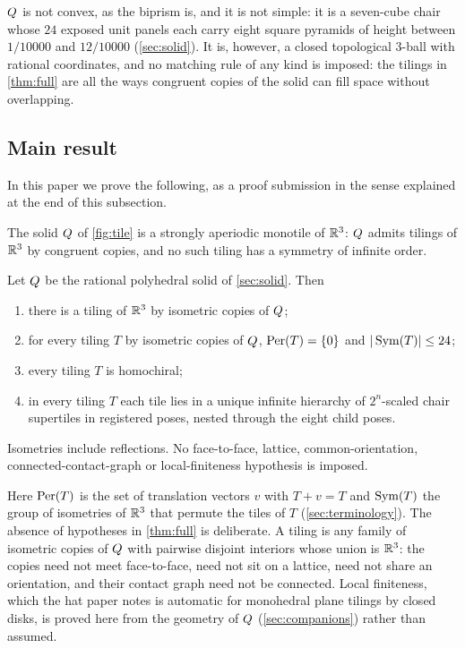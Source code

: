 $Q$ is not convex, as the biprism is, and it is not simple: it is a seven-cube chair whose
$24$ exposed unit panels each carry eight square pyramids of height between $1/10000$ and
$12/10000$ (\cref{sec:solid}). It is, however, a closed topological $3$-ball with rational
coordinates, and no matching rule of any kind is imposed: the tilings in \cref{thm:full} are all
the ways congruent copies of the solid can fill space without overlapping.

\subsection{Main result}\label{sec:main}

In this paper we prove the following, as a proof submission in the sense explained at the end of
this subsection.

\begin{theorem}\label{thm:main}
The solid $Q$ of \cref{fig:tile} is a strongly aperiodic monotile of $\mathbb{R}^3$: $Q$ admits
tilings of $\mathbb{R}^3$ by congruent copies, and no such tiling has a symmetry of infinite order.
\end{theorem}

\begin{theorem}\label{thm:full}
Let $Q$ be the rational polyhedral solid of \cref{sec:solid}. Then
\begin{enumerate}[label=\textup{(\arabic*)}]
  \item there is a tiling of $\mathbb{R}^3$ by isometric copies of $Q$;
  \item for every tiling $T$ by isometric copies of $Q$, $\operatorname{Per}(T)=\{0\}$ and $|\operatorname{Sym}(T)|\le 24$;
  \item every tiling $T$ is homochiral;
  \item in every tiling $T$ each tile lies in a unique infinite hierarchy of $2^n$-scaled chair
    supertiles in registered poses, nested through the eight child poses.
\end{enumerate}
Isometries include reflections. No face-to-face, lattice, common-orientation,
connected-contact-graph or local-finiteness hypothesis is imposed.
\end{theorem}

Here $\operatorname{Per}(T)$ is the set of translation vectors $v$ with $T+v=T$ and $\operatorname{Sym}(T)$ the group of
isometries of $\mathbb{R}^3$ that permute the tiles of $T$ (\cref{sec:terminology}). The absence of
hypotheses in \cref{thm:full} is deliberate. A tiling is any family of isometric copies of
$Q$ with pairwise disjoint interiors whose union is $\mathbb{R}^3$: the copies need not meet
face-to-face, need not sit on a lattice, need not share an orientation, and their contact graph
need not be connected. Local finiteness, which the hat paper notes is automatic for monohedral
plane tilings by closed disks, is proved here from the geometry of $Q$
(\cref{sec:companions}) rather than assumed.


